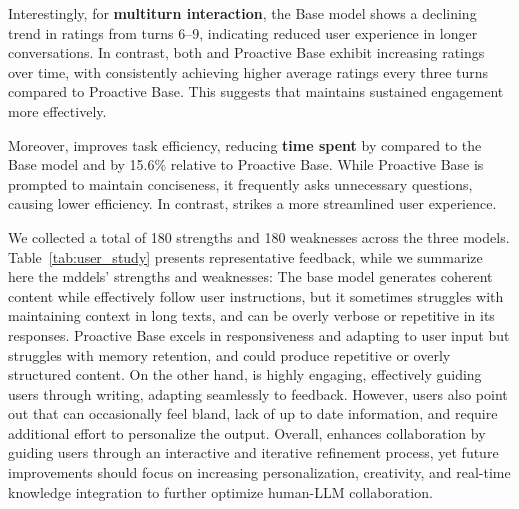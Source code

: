 Interestingly, for \textbf{multiturn interaction}, the Base model shows a declining trend in ratings from turns 6–9, indicating reduced user experience in longer conversations. In contrast, both \name{} and Proactive Base exhibit increasing ratings over time, with \name{} consistently achieving higher average ratings every three turns compared to Proactive Base. This suggests that \name{} maintains sustained engagement more effectively.  

Moreover, \name{} improves task efficiency, reducing \textbf{time spent} by \realtimeimprov{} compared to the Base model and by 15.6\% relative to Proactive Base. While Proactive Base is prompted to maintain conciseness, it frequently asks unnecessary questions, causing lower efficiency. In contrast, \name{} strikes a more streamlined user experience.


 We collected a total of 180 strengths and 180 weaknesses across the three models. Table~\ref{tab:user_study} presents representative feedback, while we summarize here the mddels' strengths and weaknesses:
The base model generates coherent content while effectively follow user instructions, but it sometimes struggles with maintaining context in long texts, and can be overly verbose or repetitive in its responses. 
Proactive Base excels in responsiveness and adapting to user input but struggles with memory retention, and could produce repetitive or overly structured content.
On the other hand, \name{} is highly engaging, effectively guiding users through writing, adapting seamlessly to feedback. However, users also point out that \name{} can occasionally feel bland, lack of up to date information, and require additional effort to personalize the output. 
Overall, \name{} enhances collaboration by guiding users through an interactive and iterative refinement process, yet future improvements should focus on increasing personalization, creativity, and real-time knowledge integration to further optimize human-LLM collaboration.
    
